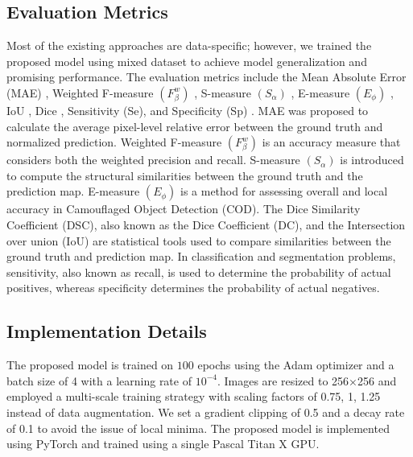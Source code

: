 \documentclass[review]{elsarticle}
\begin{document}
\subsection{Evaluation Metrics}
Most of the existing approaches are data-specific; however, we trained the proposed model using mixed dataset to achieve model generalization and promising performance. The evaluation metrics include the Mean Absolute Error (MAE) \cite{perazzi2012saliency}, Weighted F-measure  $(F^w_\beta )$ \cite{margolin2014evaluate}, S-measure $(S_\alpha)$ \cite{fan2017structure}, E-measure $(E_\phi)$ \cite{fan2021cognitive}, IoU \cite{iou}, Dice \cite{dice}, Sensitivity (Se), and Specificity (Sp) \cite{sp}. MAE was proposed to calculate the average pixel-level relative error between the ground truth and normalized prediction. Weighted F-measure $(F^w_\beta )$ is an accuracy measure that considers both the weighted precision and recall. S-measure $(S_\alpha)$ is introduced to compute the structural similarities between the ground truth and the prediction map. E-measure $(E_\phi)$ is a method for assessing overall and local accuracy in Camouflaged Object Detection (COD). The Dice Similarity Coefficient (DSC), also known as the Dice Coefficient (DC), and the Intersection over union (IoU) are statistical tools used to compare similarities between the ground truth and prediction map. In classification and segmentation problems, sensitivity, also known as recall, is used to determine the probability of actual positives, whereas specificity determines the probability of actual negatives.

\subsection{Implementation Details}
The proposed model is trained on  $100$ epochs using the Adam optimizer and a batch size of 4 with a learning rate of $10^{-4}$. Images are resized to 256×256 and employed a multi-scale training strategy with scaling factors of {0.75, 1, 1.25} instead of data augmentation. We set a gradient clipping of 0.5 and a decay rate of 0.1 to avoid the issue of local minima. The proposed model is implemented using PyTorch and trained using a single Pascal Titan X GPU.

\end{document}
